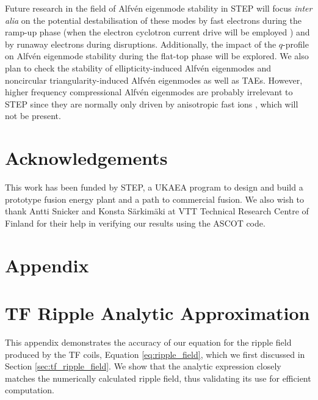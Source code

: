 \documentclass[10pt, a4paper, twoside]{article}
\begin{document}
Future research in the field of Alfv\'en eigenmode stability in STEP will focus {\it inter alia} on the potential destabilisation of these modes by fast electrons during the ramp-up phase (when the electron cyclotron current drive will be employed \cite{Henderson2024}) and by runaway electrons during disruptions. Additionally, the impact of the $q$-profile on Alfv\'en eigenmode stability during the flat-top phase will be explored. We also plan to check the stability of ellipticity-induced Alfv\'en eigenmodes and noncircular triangularity-induced Alfv\'en eigenmodes as well as TAEs. However, higher frequency compressional Alfv\'en eigenmodes are probably irrelevant to STEP since they are normally only driven by anisotropic fast ions \cite{Gorelenkov2016}, which will not be present. 




\section*{Acknowledgements}

This work has been funded by STEP, a UKAEA program to design and build a prototype fusion energy plant and a path to commercial fusion. We also wish to thank Antti Snicker and Konsta S\"arkim\"aki at VTT Technical Research Centre of Finland for their help in verifying our results using the ASCOT code.

\section*{Appendix}

\appendix

\section{TF Ripple Analytic Approximation}
\label{appendix:tf_ripple_analytic_approximation}

This appendix demonstrates the accuracy of our equation for the ripple field produced by the TF coils, Equation \eqref{eq:ripple_field}, which we first discussed in Section \ref{sec:tf_ripple_field}. We show that the analytic expression closely matches the numerically calculated ripple field, thus validating its use for efficient computation.
\end{document}
